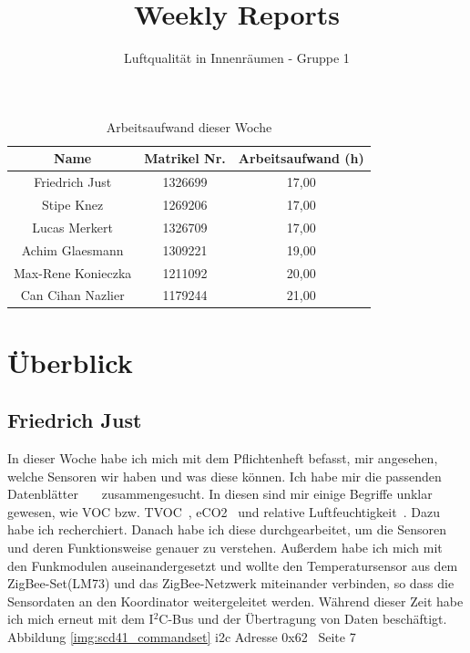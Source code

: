 \documentclass[]{article}
\title{Weekly Reports}
\author{Luftqualität in Innenräumen - Gruppe 1}
\begin{document}
\maketitle

\begin{table}[h!]
	\centering
	\begin{tabular}{|c|c|c|}
		\hline
		{\textbf{Name}}				&		{\textbf{Matrikel Nr.}} & {\textbf{Arbeitsaufwand (h)}} \\
		\hline
		Friedrich Just				&		1326699 				&	17,00	\\
		\hline
		Stipe Knez				&		1269206 				&	17,00	\\
		\hline
		Lucas Merkert				&		1326709					&	17,00	\\
		\hline
		Achim Glaesmann				&		1309221					&	19,00	\\
		\hline
		Max-Rene Konieczka			&		1211092					&	20,00	\\
		\hline
		Can Cihan Nazlier			&		1179244					&	21,00	\\
		\hline
	\end{tabular}
	\caption{Arbeitsaufwand dieser Woche}
	\label{tab:worakload}
\end{table}



\section{Überblick}


\subsection{Friedrich Just}
In dieser Woche habe ich mich mit dem Pflichtenheft befasst, mir angesehen, welche Sensoren wir haben und was diese können. Ich habe mir die passenden Datenblätter~\cite{datasheetcss811}~\cite{datasheetscd41}~\cite{datasheetsht21} zusammengesucht. In diesen sind mir einige Begriffe unklar gewesen, wie VOC bzw. TVOC~\cite{tvoc}, eCO2~\cite{eco2} und relative Luftfeuchtigkeit~\cite{realtiveluftfeuchtigkeit}. Dazu habe ich recherchiert. Danach habe ich diese durchgearbeitet, um die Sensoren und deren Funktionsweise genauer zu verstehen. Außerdem habe ich mich mit den Funkmodulen auseinandergesetzt und wollte den Temperatursensor aus dem ZigBee-Set(LM73) und das ZigBee-Netzwerk miteinander verbinden, so dass die Sensordaten an den Koordinator weitergeleitet werden. Während dieser Zeit habe ich mich erneut mit dem I$^2$C-Bus und der Übertragung von Daten beschäftigt.
{Abbildung \ref{img:scd41_commandset}}
i2c Adresse 0x62 ~\cite{datasheetscd41}Seite 7
\end{document}
